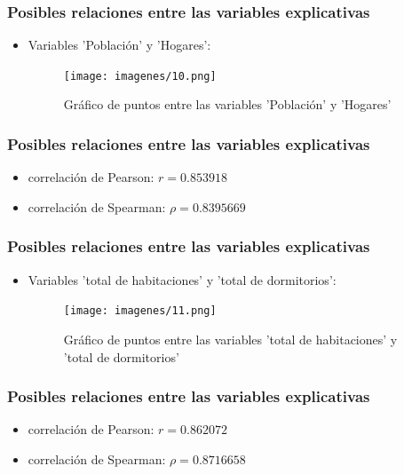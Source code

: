 \documentclass[12pt]{beamer}
\begin{document}
\begin{frame}
\frametitle{Posibles relaciones entre las variables explicativas}
\begin{itemize}
\item Variables 'Población' y 'Hogares':
\begin{figure}[!h]
    \begin{center}
        \texttt{[image: imagenes/10.png]}
        \caption{Gráfico de puntos entre las variables 'Población' y 'Hogares'}
        \label{fig:Densidad}
    \end{center}
\end{figure}
\end{itemize}
\end{frame}

\begin{frame}
\frametitle{Posibles relaciones entre las variables explicativas}
\begin{itemize}
\item correlación de Pearson: $r=0.853918$
\item correlación de Spearman: $\rho=0.8395669$
\end{itemize}
\end{frame}

\begin{frame}
\frametitle{Posibles relaciones entre las variables explicativas}
\begin{itemize}
\item Variables 'total de habitaciones' y 'total de dormitorios':
\begin{figure}[!h]
    \begin{center}
        \texttt{[image: imagenes/11.png]}
        \caption{Gráfico de puntos entre las variables 'total de habitaciones' y 'total de dormitorios'}
        \label{fig:Densidad}
    \end{center}
\end{figure}
\end{itemize}
\end{frame}

\begin{frame}
\frametitle{Posibles relaciones entre las variables explicativas}
\begin{itemize}
\item correlación de Pearson: $r=0.862072$
\item correlación de Spearman: $\rho=0.8716658$
\end{itemize}
\end{frame}
\end{document}
